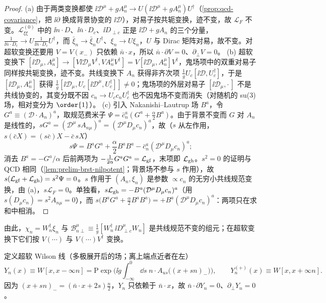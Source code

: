 \begin{proof}
(a) 由于两类变换都使 $\ii\mathcal D^\mu+gA_n^\mu\to U(\ii\mathcal D^\mu+gA_n^\mu)U^\dagger$（\cref{prop:qcd-covariance}，把 $\ii\partial$ 换成背景协变的 $\ii\mathcal D$），对易子按共轭变换，迹不变，故 $\mathcal L_F$ 不变。$\mathcal L^{(0)}_{\xi\xi}$ 中的 $\ii n\cdot D$、$\ii\bar n\cdot D_c$、$\ii D_{\perp c}$ 正是 $\ii\mathcal D+gA_n$ 的三个分量，$\frac1{\ii\bar n\cdot D_c}\to U\frac1{\ii\bar n\cdot D_c}U^\dagger$，而 $\bar\xi_n\to\bar\xi_nU^\dagger$、$\xi_n\to U\xi_n$，$U$ 与 Dirac 矩阵对易，故不变。对超软变换还要用 $V=V(x_-)$ 只依赖 $\bar n\cdot x$，所以 $\bar n\cdot\partial V=0$、$\partial_\perp V=0$。
(b) 超软变换下 $[\ii\mathcal D_\mu,A_n^\mu]\to[V\ii\mathcal D_\mu V^\dagger,VA_n^\mu V^\dagger]=V[\ii\mathcal D_\mu,A_n^\mu]V^\dagger$，鬼场项中的双重对易子同样按共轭变换，迹不变。共线变换下 $A_n$ 获得非齐次项 $\frac1gU_c[\ii\mathcal D,U_c^\dagger]$，于是 $[\ii\mathcal D_\mu,A_n^\mu]$ 获得 $\frac1g[\ii\mathcal D_\mu,U_c[\ii\mathcal D^\mu,U_c^\dagger]]\neq0$；鬼场项的外层对易子 $[\ii\mathcal D_\mu,\cdot\,]$ 不是共线协变的，其变分既不因 $c_n\to U_cc_nU_c^\dagger$ 也不因鬼场不变而消失（对随机的 su(3) 场，相对变分为 $\order{1}$）。%
(c) 引入 Nakanishi--Lautrup 场 $B^a$，令 $G^a\equiv(\mathcal D\cdot A_n)^a$，取规范费米子 $\Psi=\bar c_n^a(G^a+\frac\alpha2B^a)$。由于背景不变而 $G$ 对 $A_n$ 是线性的，$sG^a=(\mathcal D^\mu\,sA_{n\mu})^a=(\mathcal D^\mu D_\mu c_n)^a$，故（$s$ 从左作用，$s(\bar cX)=(s\bar c)X-\bar c\,sX$）
\[
s\Psi=B^aG^a+\frac\alpha2B^aB^a-\bar c_n^a(\mathcal D^\mu D_\mu c_n)^a ;
\]
消去 $B^a=-G^a/\alpha$ 后前两项为 $-\frac1{2\alpha}G^aG^a=\mathcal L_{\rm gf}$，末项即 $\mathcal L_{\rm gh}$。$s^2=0$ 的证明与 QCD 相同（\cref{lem:prelim-brst-nilpotent}；背景场不参与 $s$ 作用），故 $s(\mathcal L_{\rm gf}+\mathcal L_{\rm gh})=s^2\Psi=0$。$s$ 作用于 $(A_n,\xi_n)$ 是参数 $\propto c_n$ 的无穷小共线规范变换，由 (a)，$s\mathcal L_F=0$。单独看，$s\mathcal L_{\rm gh}=-B^a(\mathcal D^\mu D_\mu c_n)^a$（用 $s(D_\mu c_n)=s^2A_{n\mu}=0$），而 $s\big(B^aG^a+\frac\alpha2B^aB^a\big)=+B^a(\mathcal D^\mu D_\mu c_n)^a$：两项只在求和中相消。
\end{proof}

由此，$\chi_n=W_n^\dagger\xi_n$ 与 $\mathcal B^\mu_{n\perp}\equiv\frac1g[W_n^\dagger\,\ii D^\mu_{\perp c}W_n]$ 是共线规范不变的组元；在超软变换下它们按 $V(\cdots)$ 与 $V(\cdots)V^\dagger$ 变换。

定义超软 Wilson 线（多极展开后的场；离上端点近者在左）
\begin{equation}\label{eq:scet-Yn}
Y_n(x)\equiv W[x,x-\infty n]=\mathrm P\exp\Big(\ii g\int_{-\infty}^0\dd s\;n\cdot A_{us}\big((x+sn)_-\big)\Big),\qquad
Y_n^{(+)}(x)\equiv W[x,x+\infty n].
\end{equation}
因为 $(x+sn)_-=(\bar n\cdot x+2s)\frac n2$，$Y_n$ 只依赖于 $\bar n\cdot x$，故 $\bar n\cdot\partial Y_n=0$、$\partial_\perp Y_n=0$。

